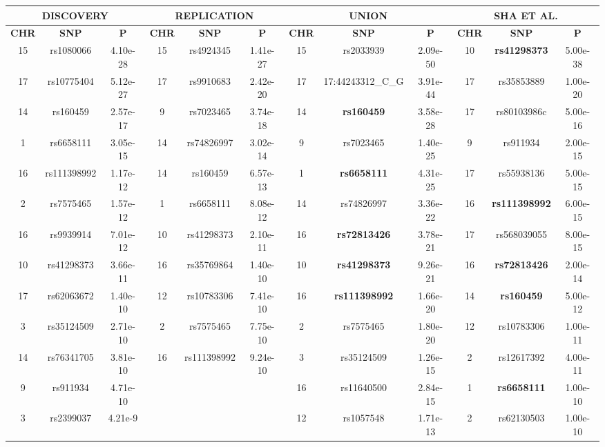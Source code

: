 \begin{adjustwidth}{-3 cm}{-2.5 cm}\centering\begin{threeparttable}[!htb]	
		\scriptsize
		\begin{tabular}{ccc||ccc||ccc||ccc}\toprule
			\multicolumn{3}{c}{\textbf{DISCOVERY}} &\multicolumn{3}{c}{\textbf{REPLICATION}} &\multicolumn{3}{c}{\textbf{UNION}} &\multicolumn{3}{c}{\textbf{SHA ET AL.}} \\\midrule
			\textbf{CHR} &\textbf{SNP} &\textbf{P} &\textbf{CHR} &\textbf{SNP} &\textbf{P} &\textbf{CHR} &\textbf{SNP} &\textbf{P} &\textbf{CHR} &\textbf{SNP} &\textbf{P} \\
			15 &rs1080066 &4.10e-28 &15 &rs4924345 &1.41e-27 &15 &rs2033939 &2.09e-50 &10 &\textbf{rs41298373} &5.00e-38 \\
			17 &rs10775404 &5.12e-27 &17 &rs9910683 &2.42e-20 &17 &17:44243312\_C\_G &3.91e-44 &17 &rs35853889 &1.00e-20 \\
			14 &rs160459 &2.57e-17 &9 &rs7023465 &3.74e-18 &14 &\textbf{rs160459} &3.58e-28 &17 &rs80103986c &5.00e-16 \\
			1 &rs6658111 &3.05e-15 &14 &rs74826997 &3.02e-14 &9 &rs7023465 &1.40e-25 &9 &rs911934 &2.00e-15 \\
			16 &rs111398992 &1.17e-12 &14 &rs160459 &6.57e-13 &1 &\textbf{rs6658111} &4.31e-25 &17 &rs55938136 &5.00e-15 \\
			2 &rs7575465 &1.57e-12 &1 &rs6658111 &8.08e-12 &14 &rs74826997 &3.36e-22 &16 &\textbf{rs111398992} &6.00e-15 \\
			16 &rs9939914 &7.01e-12 &10 &rs41298373 &2.10e-11 &16 &\textbf{rs72813426} &3.78e-21 &17 &rs568039055 &8.00e-15 \\
			10 &rs41298373 &3.66e-11 &16 &rs35769864 &1.40e-10 &10 &\textbf{rs41298373} &9.26e-21 &16 &\textbf{rs72813426} &2.00e-14 \\
			17 &rs62063672 &1.40e-10 &12 &rs10783306 &7.41e-10 &16 &\textbf{rs111398992} &1.66e-20 &14 &\textbf{rs160459} &5.00e-12 \\
			3 &rs35124509 &2.71e-10 &2 &rs7575465 &7.75e-10 &2 &rs7575465 &1.80e-20 &12 &rs10783306 &1.00e-11 \\
			14 &rs76341705 &3.81e-10 &16 &rs111398992 &9.24e-10 &3 &rs35124509 &1.26e-15 &2 &rs12617392 &4.00e-11 \\
			9 &rs911934 &4.71e-10 & & & &16 &rs11640500 &2.84e-15 &1 &\textbf{rs6658111} &1.00e-10 \\
			3 &rs2399037 &4.21e-9 & & & &12 &rs1057548 &1.71e-13 &2 &rs62130503 &1.00e-10 \\

\end{tabular}
\end{threeparttable}
\end{adjustwidth}

